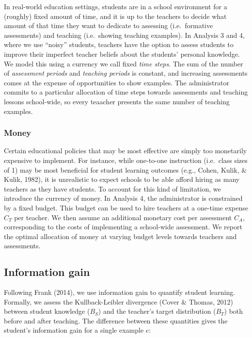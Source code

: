 \documentclass[10pt, letterpaper]{article}
\begin{document}
In real-world education settings, students are in a school environment
for a (roughly) fixed amount of time, and it is up to the teachers to
decide what amount of that time they want to dedicate to assessing
(i.e.~formative assessments) and teaching (i.e.~showing teaching
examples). In Analysis 3 and 4, where we use ``noisy'' students,
teachers have the option to assess students to improve their imperfect
teacher beliefs about the students' personal knowledge. We model this
using a currency we call fixed \emph{time steps}. The sum of the number
of \emph{assessment periods} and \emph{teaching periods} is constant,
and increasing assessments comes at the expense of opportunities to show
examples. The administrator commits to a particular allocation of time
steps towards assessments and teaching lessons school-wide, so every
teaacher presents the same number of teaching examples.

\subsubsection{Money}\label{money}

Certain educational policies that may be most effective are simply too
monetarily expensive to implement. For instance, while one-to-one
instruction (i.e.~class sizes of 1) may be most beneficial for student
learning outcomes (e.g., Cohen, Kulik, \& Kulik, 1982), it is
unrealistic to expect schools to be able afford hiring as many teachers
as they have students. To account for this kind of limitation, we
introduce the currency of money. In Analysis 4, the administrator is
constrained by a fixed budget. This budget can be used to hire teachers
at a one-time expense \(C_T\) per teacher. We then assume an additional
monetary cost per assessment \(C_A\), corresponding to the costs of
implementing a school-wide assessment. We report the optimal allocation
of money at varying budget levels towards teachers and assessments.

\subsection{Information gain}\label{information-gain}

Following Frank (2014), we use information gain to quantify student
learning. Formally, we assess the Kullback-Leibler divergence (Cover \&
Thomas, 2012) between student knowledge (\(B_S\)) and the teacher's
target distribution (\(B_T\)) both before and after teaching. The
difference between these quantities gives the student's information gain
for a single example \(e\):
\end{document}
